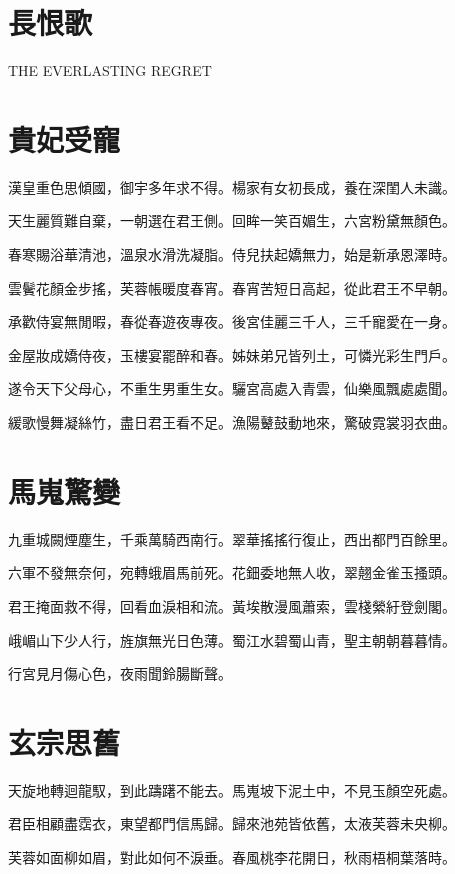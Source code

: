 \documentclass[UTF8]{ctexart}
\begin{document}
\section*{長恨歌}

THE EVERLASTING REGRET

\section{貴妃受寵}

漢皇重色思傾國，御宇多年求不得。楊家有女初長成，養在深閨人未識。

天生麗質難自棄，一朝選在君王側。回眸一笑百媚生，六宮粉黛無顏色。

春寒賜浴華清池，溫泉水滑洗凝脂。侍兒扶起嬌無力，始是新承恩澤時。

雲鬢花顏金步搖，芙蓉帳暖度春宵。春宵苦短日高起，從此君王不早朝。

承歡侍宴無閒暇，春從春遊夜專夜。後宮佳麗三千人，三千寵愛在一身。

金屋妝成嬌侍夜，玉樓宴罷醉和春。姊妹弟兄皆列土，可憐光彩生門戶。

遂令天下父母心，不重生男重生女。驪宮高處入青雲，仙樂風飄處處聞。

緩歌慢舞凝絲竹，盡日君王看不足。漁陽鼙鼓動地來，驚破霓裳羽衣曲。

\section{馬嵬驚變}

九重城闕煙塵生，千乘萬騎西南行。翠華搖搖行復止，西出都門百餘里。

六軍不發無奈何，宛轉蛾眉馬前死。花鈿委地無人收，翠翹金雀玉搔頭。

君王掩面救不得，回看血淚相和流。黃埃散漫風蕭索，雲棧縈紆登劍閣。

峨嵋山下少人行，旌旗無光日色薄。蜀江水碧蜀山青，聖主朝朝暮暮情。

行宮見月傷心色，夜雨聞鈴腸斷聲。

\section{玄宗思舊}

天旋地轉迴龍馭，到此躊躇不能去。馬嵬坡下泥土中，不見玉顏空死處。

君臣相顧盡霑衣，東望都門信馬歸。歸來池苑皆依舊，太液芙蓉未央柳。

芙蓉如面柳如眉，對此如何不淚垂。春風桃李花開日，秋雨梧桐葉落時。
\end{document}
